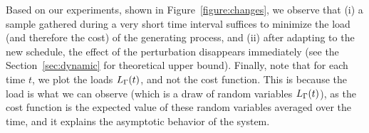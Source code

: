 Based on our experiments, shown in Figure~\ref{figure:changes}, we observe that (i) a sample gathered during a very short time interval suffices to minimize the load (and therefore the cost) of the generating process, and (ii) after adapting to the new schedule, the effect of the perturbation disappears immediately (see the Section~\ref{sec:dynamic} for theoretical upper bound). Finally, note that for each time $t$, we plot the loads $L_\Gamma(t)$, and not the cost function. This is because the load is what we can observe (which is a draw of random variables $L_\Gamma(t)$), as the cost function is the expected value of these random variables averaged over the time, and it explains  the asymptotic behavior of the system.



\begin{figure}
  \\ %

\end{figure}
